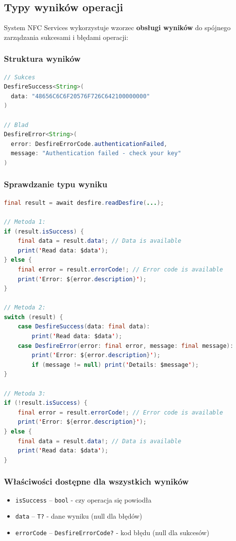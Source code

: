 \documentclass[a4paper,12pt]{article}
\begin{document}
\newpage

\subsection{Typy wyników operacji}
System NFC Services wykorzystuje wzorzec \textbf{obsługi wyników} do spójnego zarządzania sukcesami i błędami operacji:

\subsubsection*{Struktura wyników}
\begin{lstlisting}[language=Java]
// Sukces
DesfireSuccess<String>(
  data: "48656C6C6F20576F726C642100000000"
)

// Blad
DesfireError<String>(
  error: DesfireErrorCode.authenticationFailed,
  message: "Authentication failed - check your key"
)
\end{lstlisting}

\subsubsection*{Sprawdzanie typu wyniku}
\begin{lstlisting}[language=Java]
final result = await desfire.readDesfire(...);

// Metoda 1:
if (result.isSuccess) {
    final data = result.data!; // Data is available
    print('Read data: $data');
} else {
    final error = result.errorCode!; // Error code is available
    print('Error: ${error.description}');
}

// Metoda 2:
switch (result) {
    case DesfireSuccess(data: final data):
        print('Read data: $data');
    case DesfireError(error: final error, message: final message):
        print('Error: ${error.description}');
        if (message != null) print('Details: $message');
}

// Metoda 3:
if (!result.isSuccess) {
    final error = result.errorCode!; // Error code is available
    print('Error: ${error.description}');
} else {
    final data = result.data!; // Data is available
    print('Read data: $data');
}
\end{lstlisting}

\newpage

\subsubsection*{Właściwości dostępne dla wszystkich wyników}
\begin{itemize}
    \item \texttt{isSuccess} -- \texttt{bool} - czy operacja się powiodła
    \item \texttt{data} -- \texttt{T?} - dane wyniku (null dla błędów)
    \item \texttt{errorCode} -- \texttt{DesfireErrorCode?} - kod błędu (null dla sukcesów)
\end{itemize}
\end{document}
